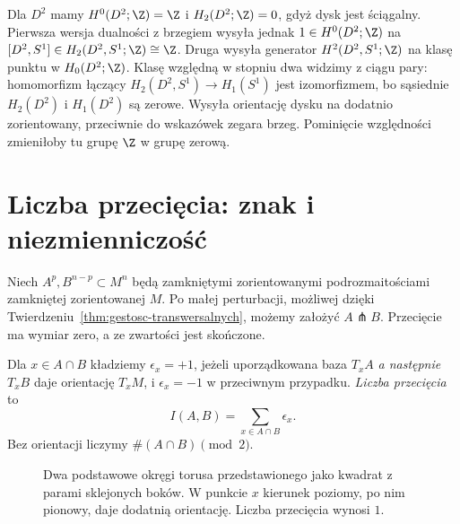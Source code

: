 \begin{przyklad}
\label{prz:pd-dysk-21}
Dla $D^2$ mamy $H^0(D^2;\Z)=\Z$ i
$H_2(D^2;\Z)=0$, gdyż dysk jest ściągalny.
Pierwsza wersja dualności z brzegiem wysyła jednak
$1\in H^0(D^2;\Z)$ na
$[D^2,S^1]\in H_2(D^2,S^1;\Z)\cong\Z$.
Druga wysyła generator $H^2(D^2,S^1;\Z)$ na klasę
punktu w $H_0(D^2;\Z)$.
Klasę względną w stopniu dwa widzimy z ciągu pary:
homomorfizm łączący
$H_2(D^2,S^1)\to H_1(S^1)$ jest izomorfizmem,
bo sąsiednie $H_2(D^2)$ i $H_1(D^2)$ są zerowe.
Wysyła orientację dysku na dodatnio zorientowany,
przeciwnie do wskazówek zegara brzeg.
Pominięcie względności zmieniłoby tu grupę $\Z$ w grupę zerową.
\end{przyklad}

\section{Liczba przecięcia: znak i niezmienniczość}
\label{sec:przeciecia-16}

Niech $A^p,B^{n-p}\subset M^n$ będą
zamkniętymi zorientowanymi
podrozmaitościami zamkniętej
zorientowanej $M$. Po małej
perturbacji, możliwej dzięki
Twierdzeniu~\ref{thm:gestosc-transwersalnych},
możemy założyć $A\pitchfork B$.
Przecięcie ma wymiar zero,
a ze zwartości jest skończone.

\begin{definicja}
\label{def:liczba-przeciecia-16}
Dla $x\in A\cap B$ kładziemy
$\epsilon_x=+1$, jeżeli
uporządkowana baza
$T_xA$ \emph{a następnie}
$T_xB$ daje orientację $T_xM$,
i $\epsilon_x=-1$ w przeciwnym
przypadku. \emph{Liczba
przecięcia} to
\[
 I(A,B)=\sum_{x\in A\cap B}\epsilon_x.
\]
Bez orientacji liczymy
$\#(A\cap B)\pmod 2$.
\end{definicja}

\begin{figure}[H]
\centering
{}
\caption{Dwa podstawowe okręgi torusa
przedstawionego jako kwadrat z parami
sklejonych boków. W punkcie $x$ kierunek
poziomy, po nim pionowy, daje dodatnią
orientację. Liczba przecięcia wynosi $1$.}
\label{fig:przeciecie-torus-16}
\end{figure}

